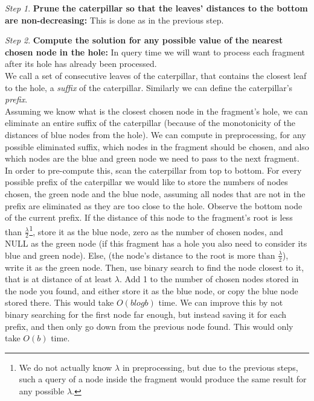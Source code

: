 \documentclass[11pt,a4paper]{article}
\theoremstyle{definition}
\theoremstyle{remark}
\newtheorem{step}{Step}[section]
\begin{document}
\begin{step}
\textbf{Prune the caterpillar so that the leaves' distances to the bottom are non-decreasing:}
This is done as in the previous step.
\end{step}
\begin{step}
\textbf{Compute the solution for any possible value of the nearest chosen node in the hole:}
In query time we will want to process each fragment after its hole has already been processed.\\
We call a set of consecutive leaves of the caterpillar, that contains the closest leaf to the hole, a \emph{suffix} of the caterpillar. Similarly we can define the caterpillar's \emph{prefix}.\\
Assuming we know what is the closest chosen node in the fragment's hole, we can eliminate an entire suffix of the caterpillar (because of the monotonicity of the distances of blue nodes from the hole). We can compute in preprocessing, for any possible eliminated suffix, which nodes in the fragment should be chosen, and also which nodes are the blue and green node we need to pass to the next fragment.\\
In order to pre-compute this, scan the caterpillar from top to bottom. For every possible prefix of the caterpillar we would like to store the numbers of nodes chosen, the green node and the blue node, assuming all nodes that are not in the prefix are eliminated as they are too close to the hole. Observe the bottom node of the current prefix. If the distance of this node to the fragment's root is less than $\frac{\lambda}{2}$\footnote{We do not actually know $\lambda$ in preprocessing, but due to the previous steps, such a query of a node inside the fragment would produce the same result for any possible $\lambda$.}, store it as the blue node, zero as the number of chosen nodes, and NULL as the green node (if this fragment has a hole you also need to consider its blue and green node). Else, (the node's distance to the root is more than $\frac{\lambda}{2}$), write it as the green node. Then, use binary search to find the node closest to it, that is at distance of at least $\lambda$. Add 1 to the number of chosen nodes stored in the node you found, and either store it as the blue node, or copy the blue node stored there. This would take $O(blogb)$ time. We can improve this by not binary searching for the first node far enough, but instead saving it for each prefix, and then only go down from the previous node found. This would only take $O(b)$ time.
\end{step}
\end{document}
